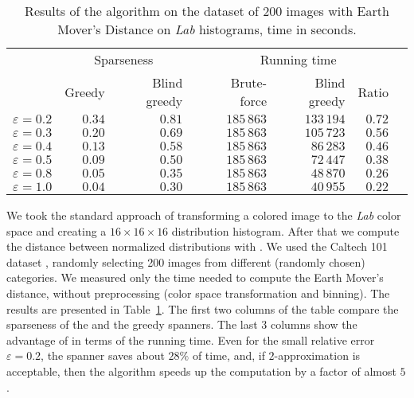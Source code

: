 \documentclass[]{ws-ijcga}
\newcommand{\eps}{\varepsilon}
\begin{document}
\begin{table}\centering
    \begin{tabular}{@{}rrrcrrrc@{}}\toprule
        & \multicolumn{2}{c}{Sparseness} & \phantom{abc} & \multicolumn{3}{c}{Running time} \\
        \cmidrule{2-3} \cmidrule{5-7} 
                & Greedy  & Blind greedy && Brute-force & Blind greedy & Ratio \\ \midrule
$\eps = 0.2$    &   $0.34$  &  $0.81$    &&  $185\,863$   & $133\,194$    & $0.72$   \\
$\eps = 0.3$    &   $0.20$  &  $0.69$    &&  $185\,863$   & $105\,723$    & $0.56$   \\
$\eps = 0.4$    &   $0.13$  &  $0.58$    &&  $185\,863$   & $86\,283$    & $0.46$   \\
$\eps = 0.5$    &   $0.09$  &  $0.50$    &&  $185\,863$   & $72\,447$    & $0.38$   \\
$\eps = 0.8$    &   $0.05$  &  $0.35$    &&  $185\,863$   & $48\,870$    & $0.26$   \\
$\eps = 1.0$    &   $0.04$  &  $0.30$    &&  $185\,863$   & $40\,955$    & $0.22$   \\
\bottomrule
\end{tabular}
    \caption{Results of the \bgrdy algorithm on the dataset of 200 images
    with Earth Mover's Distance on \textit{Lab} histograms, time in seconds.}
\label{tbl:emd_lab_caltech}
\end{table}

We took the standard approach \cite{rubner2000earth} of transforming a colored image
to the \textit{Lab} color space and creating a $16\times 16\times 16$
distribution histogram. After that we compute the distance between normalized
distributions with \cite{doran_pyemd}.
We used the Caltech 101 dataset \cite{caltech101},
randomly selecting 200 images from different (randomly chosen)
categories.  We measured only the time needed to compute
the Earth Mover's distance, without preprocessing (color space transformation
and binning). The results are presented in Table~\ref{tbl:emd_lab_caltech}.
The first two columns of the table compare the sparseness of the \bgrdy and the greedy spanners.
The last 3 columns show the advantage
of \bgrdy in terms of the running time.
Even for the small relative error $\eps = 0.2$,
the \bgrdy spanner saves about $28\%$ of time,
and, if {$2$-approximation} is acceptable,
then the \bgrdy algorithm speeds up
the computation by a factor of almost $5$.
\end{document}
